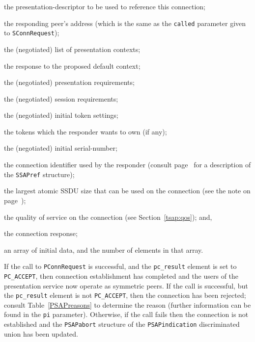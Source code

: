\begin{describe}
\item[\verb"pc\_sd":] the presentation-descriptor to be used to reference this
connection;

\item[\verb"pc\_responding":] the responding peer's address
(which is the same as the \verb"called" parameter given to
\verb"SConnRequest");

\item[\verb"pc\_ctxlist":] the (negotiated) list of presentation contexts;

\item[\verb"pc\_defctxresult":] the response to the proposed default context;

\item[\verb"pc\_prequirements":] the (negotiated) presentation requirements;

\item[\verb"pc\_srequirements":] the (negotiated) session requirements;

\item[\verb"pc\_settings":] the (negotiated) initial token settings;

\item[\verb"pc\_please":] the tokens which the responder wants to own
(if any);

\item[\verb"pc\_isn":] the (negotiated) initial serial-number;

\item[\verb"pc\_connect":] the connection identifier used by the responder
(consult page~\pageref{SSAPref} for a description of the \verb"SSAPref"
structure);

\item[\verb"pc\_ssdusize":] the largest atomic SSDU size that can be used on
the connection (see the note on page~\pageref{SSDU:atomic});

\item[\verb"pc\_qos":] the quality of service on the connection
(see Section~\ref{tsap:qos});
and,

\item[\verb"pc\_result":] the connection response;

\item[\verb"pc\_info"/\verb"pc\_ninfo":] an array of initial data,
and the number of elements in that array.
\end{describe}
If the call to \verb"PConnRequest" is successful,
and the \verb"pc_result" element is set to \verb"PC_ACCEPT",
then connection establishment has completed and the users of the presentation
service now operate as symmetric peers.
If the call is successful,
but the \verb"pc_result" element is not \verb"PC_ACCEPT",
then the connection has been rejected;
consult Table~\ref{PSAPreasons} to determine the reason
(further information can be found in the \verb"pi" parameter).
Otherwise, if the call fails then the connection is not established and the
\verb"PSAPabort" structure of the \verb"PSAPindication" discriminated union
has been updated.

